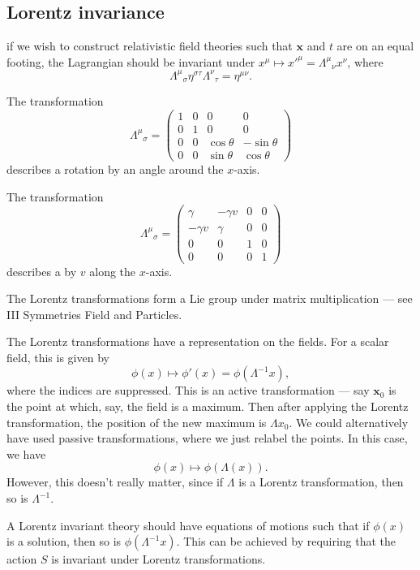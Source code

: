 \documentclass[a4paper]{article}
\begin{document}
\subsection{Lorentz invariance}
if we wish to construct relativistic field theories such that $\mathbf{x}$ and $t$ are on an equal footing, the Lagrangian should be invariant under  $x^\mu \mapsto x'^\mu = \Lambda^\mu\!_\nu x^\nu$, where
\[
  \Lambda^\mu\!_\sigma \eta^{\sigma\tau} \Lambda^\nu\!_\tau = \eta^{\mu\nu}.
\]
\begin{eg}
  The transformation
  \[
    \Lambda^\mu\!_\sigma =
    \begin{pmatrix}
      1 & 0 & 0 & 0\\
      0 & 1 & 0 & 0\\
      0 & 0 & \cos \theta & -\sin \theta\\
      0 & 0 & \sin \theta & \cos \theta
    \end{pmatrix}
  \]
  describes a rotation by an angle around the $x$-axis.
\end{eg}

\begin{eg}
  The transformation
  \[
    \Lambda^\mu\!_\sigma =
    \begin{pmatrix}
      \gamma & -\gamma v & 0 & 0\\
      -\gamma v & \gamma & 0 & 0\\
      0 & 0 & 1 & 0\\
      0 & 0 & 0 & 1
    \end{pmatrix}
  \]
  describes a  by $v$ along the $x$-axis.
\end{eg}
The Lorentz transformations form a Lie group under matrix multiplication --- see III Symmetries Field and Particles.

The Lorentz transformations have a representation on the fields. For a scalar field, this is given by
\[
  \phi(x) \mapsto \phi'(x) = \phi(\Lambda^{-1}x),
\]
where the indices are suppressed. This is an active transformation --- say $\mathbf{x}_0$ is the point at which, say, the field is a maximum. Then after applying the Lorentz transformation, the position of the new maximum is $\Lambda x_0$. We could alternatively have used passive transformations, where we just relabel the points. In this case, we have
\[
  \phi(x) \mapsto \phi(\Lambda (x)).
\]
However, this doesn't really matter, since if $\Lambda$ is a Lorentz transformation, then so is $\Lambda^{-1}$.

A Lorentz invariant theory should have equations of motions such that if $\phi(x)$ is a solution, then so is $\phi(\Lambda^{-1} x)$. This can be achieved by requiring that the action $S$ is invariant under Lorentz transformations.
\end{document}
